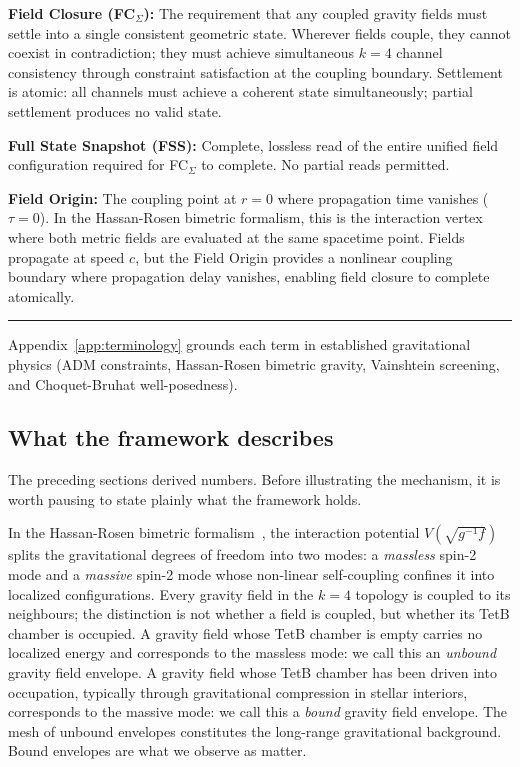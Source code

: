 \documentclass[aps,prd,preprint,superscriptaddress,showpacs,preprintnumbers,amsmath,amssymb,nofootinbib]{revtex4-2}
\begin{document}
\smallskip

\noindent\textbf{Field Closure (FC$_{\Sigma}$):} The requirement that any coupled gravity fields must settle into a single consistent geometric state. Wherever fields couple, they cannot coexist in contradiction; they must achieve simultaneous $k = 4$ channel consistency through constraint satisfaction at the coupling boundary. Settlement is atomic: all channels must achieve a coherent state simultaneously; partial settlement produces no valid state.

\smallskip

\noindent\textbf{Full State Snapshot (FSS):} Complete, lossless read of the entire unified field configuration required for FC$_{\Sigma}$ to complete. No partial reads permitted.

\smallskip

\noindent\textbf{Field Origin:} The coupling point at $r = 0$ where propagation time vanishes ($\tau = 0$). In the Hassan-Rosen bimetric formalism, this is the interaction vertex where both metric fields are evaluated at the same spacetime point. Fields propagate at speed $c$, but the Field Origin provides a nonlinear coupling boundary where propagation delay vanishes, enabling field closure to complete atomically.

\noindent\rule{\textwidth}{0.4pt}

{\small Appendix~\ref{app:terminology} grounds each term in established gravitational physics (ADM constraints, Hassan-Rosen bimetric gravity, Vainshtein screening, and Choquet-Bruhat well-posedness).}

\subsection{What the framework describes}
\label{subsec:whatwehold}

The preceding sections derived numbers. Before illustrating the mechanism, it is worth pausing to state plainly what the framework holds.

In the Hassan-Rosen bimetric formalism~\cite{hassan2012}, the interaction potential $V(\sqrt{g^{-1}f})$ splits the gravitational degrees of freedom into two modes: a \emph{massless} spin-2 mode and a \emph{massive} spin-2 mode whose non-linear self-coupling confines it into localized configurations. Every gravity field in the $k = 4$ topology is coupled to its neighbours; the distinction is not whether a field is coupled, but whether its TetB chamber is occupied. A gravity field whose TetB chamber is empty carries no localized energy and corresponds to the massless mode: we call this an \emph{unbound} gravity field envelope. A gravity field whose TetB chamber has been driven into occupation, typically through gravitational compression in stellar interiors, corresponds to the massive mode: we call this a \emph{bound} gravity field envelope. The mesh of unbound envelopes constitutes the long-range gravitational background. Bound envelopes are what we observe as matter.
\end{document}
